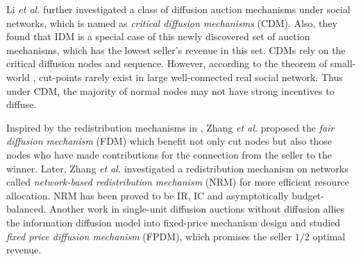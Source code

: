 \documentclass{article}
\newtheorem{definition}{Definition}
\begin{document}
Li \textit{et al.}  further investigated a class of diffusion auction mechanisms under social networks, which is named as \emph{critical diffusion mechanisms} (CDM). Also, they found that IDM is a special case of this newly discovered set of auction mechanisms, which has the lowest seller's revenue in this set. CDMs rely on the critical diffusion nodes and sequence. However, according to the theorem of small-world \cite{amaral2000classes}, cut-points rarely exist in large well-connected real social network.  
Thus under CDM, the majority of normal nodes may not have strong incentives to diffuse.

 Inspired by the redistribution mechanisms in \cite{cavallo2006Redistribution,guo2009redistribution,guo2012redistribution}, Zhang \emph{et al.}  proposed the \emph{fair diffusion mechanism} (FDM) which benefit not only cut nodes but also those nodes who have made contributions for the connection from the seller to the winner. Later, Zhang \emph{et al.}  investigated a redistribution mechanism on networks called \emph{network-based redistribution mechanism} (NRM) for more efficient resource allocation. NRM has been proved to be IR, IC and asymptotically budget-balanced.
 Another work \cite{zhang2019fixedprice} in single-unit diffusion auctions without diffusion allies the information diffusion model into fixed-price mechanism design and studied \emph{fixed price diffusion mechanism} (FPDM), which promises the seller $1/2$ optimal revenue.
\end{document}
